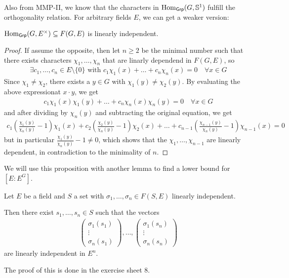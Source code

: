 Also from MMP-II, we know that the characters in $\operatorname{Hom}_{\text{\sffamily Grp}}(G,\mathbb{S}^{1})$ fulfill the orthogonality relation.
For arbitrary fields $E$, we can get a weaker version:

\begin{prop}[Dedekind]\label{prop:dedekind}
  $\operatorname{Hom}_{\text{\sffamily Grp}}(G,E^{\times}) \subseteq F(G,E)$ is linearly independent.
\end{prop}
\begin{proof}
  If assume the opposite, then let $n \geq 2$ be the minimal number such that there exists characters $\chi_1, \ldots, \chi_n$ that are linarly dependend in $F(G,E)$, so
  \begin{align*}
    \exists c_1, \ldots, c_n \in E \setminus \{0\} \text{ with } c_1 \chi_1(x) + \ldots + c_n \chi_n(x) = 0 \quad \forall x \in G
  \end{align*}
  Since $\chi_1 \neq \chi_2$, there exists a $y \in G$ with $\chi_1(y) \neq \chi_2(y)$.
  By evaluating the above expressionat $x \cdot y$, we get
  \begin{align*}
    c_1 \chi_1(x) \chi_1(y) + \ldots + c_n \chi_n(x) \chi_n(y) = 0 \quad \forall  x \in G
  \end{align*}
  and after dividing by $\chi_n(y)$ and subtracting the original equation, we get
  \begin{align*}
    c_1 \left(
      \frac{\chi_1(y)}{\chi_n(y)} - 1
    \right)
    \chi_1(x)
    +
    c_2 \left(
      \frac{\chi_2(y)}{\chi_n(y)} - 1
    \right)
    \chi_2(x)
    + \ldots
    +
    c_{n-1} \left(
      \frac{\chi_{n-1}(y)}{\chi_n(y)} - 1
    \right)
    \chi_{n-1}(x)
    =
    0
  \end{align*}
  but in particular $\frac{\chi_1(y)}{\chi_n(y)} - 1 \neq 0$, which shows that the $\chi_{1}, \ldots, \chi_{n-1}$ are linearly dependent, in contradiction to the minimality of $n$.
\end{proof}

We will use this proposition with another lemma to find a lower bound for $[E:E^{G}]$. 


\begin{lemma}[]\label{lem:4-6}
  Let $E$ be a field and $S$ a set with $\sigma_{1}, \ldots, \sigma_{n} \in F(S,E)$ linearly independent.

  Then there exist $s_{1}, \ldots, s_{n} \in S$ such that the vectors
  \begin{align*}
    \begin{pmatrix}
      \sigma_1(s_1)\\
    \vdots\\
    \sigma_n(s_1)
    \end{pmatrix}
    , \ldots
    ,
    \begin{pmatrix}
      \sigma_1(s_n)\\
    \vdots\\
    \sigma_n(s_n)
    \end{pmatrix}
  \end{align*}
  are linearly independent in $E^{n}$.
\end{lemma}
The proof of this is done in the exercise sheet 8.


